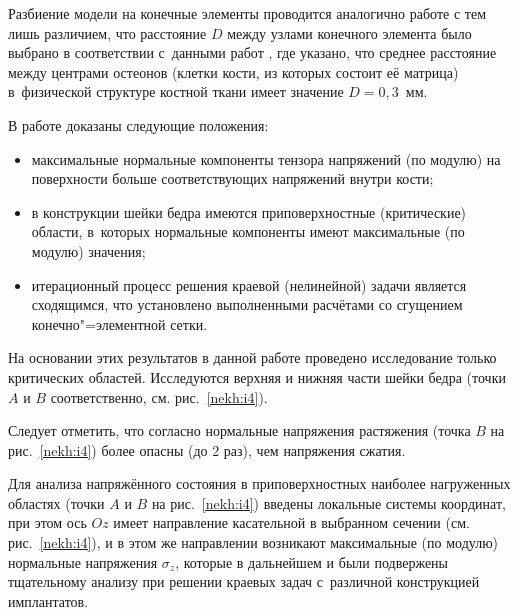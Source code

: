 
Разбиение модели на конечные элементы проводится аналогично работе \cite{nekh:b2} с тем лишь различием, что расстояние $D$ между узлами конечного элемента было выбрано в соответствии с~данными работ \cite{nekh:b12, nekh:b13}, где указано, что среднее расстояние между центрами остеонов (клетки кости, из которых состоит её матрица) в~физической структуре костной ткани имеет значение $D = 0,3$~мм.



В работе \cite{nekh:b2} доказаны следующие положения:

\begin{itemize}

\item[1)] максимальные нормальные компоненты тензора напряжений (по модулю) на поверхности больше соответствующих напряжений внутри кости;

\item[2)] в конструкции шейки бедра имеются приповерхностные (критические) области, в~которых нормальные компоненты имеют максимальные (по модулю) значения;

\item[3)] итерационный процесс решения краевой (нелинейной) задачи является сходящимся, что установлено выполненными расчётами со сгущением конечно"=элементной сетки.

\end{itemize}



На основании этих результатов  в данной работе проведено исследование только критических областей. Исследуются верхняя и нижняя части шейки бедра (точки $A$ и $B$ соответственно, см. рис.~\ref{nekh:i4}).



Следует отметить, что согласно \cite{nekh:b14} нормальные напряжения растяжения (точка $B$ на рис.~\ref{nekh:i4}) более  опасны (до 2 раз), чем напряжения сжатия.



Для анализа напряжённого состояния в приповерхностных наиболее нагруженных областях (точки $A$ и $B$ на рис.~\ref{nekh:i4}) введены локальные системы координат, при этом ось $Oz$ имеет направление касательной в выбранном сечении (см. рис.~\ref{nekh:i4}), и в этом же направлении возникают максимальные (по модулю) нормальные напряжения $\sigma_z$, которые в дальнейшем и были подвержены тщательному анализу при решении краевых задач с~различной конструкцией имплантатов.



